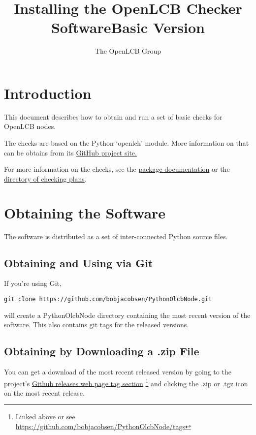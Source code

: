 \documentclass[11pt]{article}
\title{Installing the OpenLCB Checker Software\linebreak{}Basic Version}
\author{The OpenLCB Group}
\begin{document}
\maketitle


\section{Introduction}

This document describes how to obtain and run a set of basic checks for 
OpenLCB nodes.  

The checks are based on the Python `openlch' module.
More information on that can be obtains from its
\href{https://github.com/bobjacobsen/PythonOlcbNode}{GitHub project site.}

For more information on the checks, see the
\href{https://github.com/bobjacobsen/PythonOlcbNode/blob/main/olcbchecker/README.md}{package documentation}
or the 
\href{https://github.com/bobjacobsen/PythonOlcbNode/tree/main/olcbchecker/plans/}{directory of checking plans}.

\section{Obtaining the Software}

The software is distributed as a set of inter-connected Python source files.

\subsection{Obtaining and Using via Git}

If you're using Git, 
\begin{verbatim}
git clone https://github.com/bobjacobsen/PythonOlcbNode.git
\end{verbatim}
will create a PythonOlcbNode directory containing the most recent version of the software.
This also contains git tags for the released versions.

\subsection{Obtaining by Downloading a .zip File}

You can get a download of the most recent released version by going to the project's 
\href{https://github.com/bobjacobsen/PythonOlcbNode/tags}{Github releases web page tag section}
\footnote{Linked above or see \href{https://github.com/bobjacobsen/PythonOlcbNode/tags}{https://github.com/bobjacobsen/PythonOlcbNode/tags}}
and clicking the .zip or .tgz icon on the most recent release.
\end{document}
